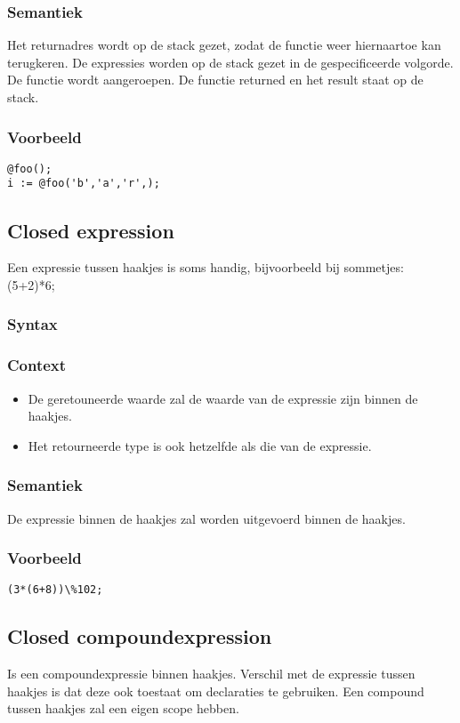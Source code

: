 \documentclass[]{article}
\begin{document}
\subsubsection{Semantiek}
Het returnadres wordt op de stack gezet, zodat de functie weer hiernaartoe kan terugkeren.
De expressies worden op de stack gezet in de gespecificeerde volgorde.
De functie wordt aangeroepen.
De functie returned en het result staat op de stack.
\subsubsection{Voorbeeld}
\begin{lstlisting}[style=SELMA]
@foo();
i := @foo('b','a','r',);
\end{lstlisting}


\subsection{Closed expression}
Een expressie tussen haakjes is soms handig, bijvoorbeeld bij sommetjes: (5+2)*6;
\subsubsection{Syntax}

\subsubsection{Context}
\begin{itemize}
\item De geretouneerde waarde zal de waarde van de expressie zijn binnen de haakjes.
\item Het retourneerde type is ook hetzelfde als die van de expressie.
\end{itemize}
\subsubsection{Semantiek}
De expressie binnen de haakjes zal worden uitgevoerd binnen de haakjes.
\subsubsection{Voorbeeld}
\begin{lstlisting}[style=SELMA]
(3*(6+8))\%102;
\end{lstlisting}

\subsection{Closed compoundexpression}
Is een compoundexpressie binnen haakjes. Verschil met de expressie tussen haakjes is dat deze ook toestaat om declaraties te gebruiken. Een compound tussen haakjes zal een eigen scope hebben.
\end{document}
